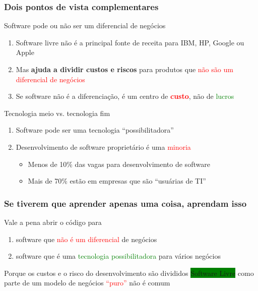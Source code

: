 \documentclass[xcolor=dvipsnames]{beamer}
\newcommand{\tred}[1]{\textcolor{red}{#1}}
\newcommand{\tgreen}[1]{\textcolor{green}{#1}}
\newcommand{\bgreen}[1]{\colorbox{green}{#1}}
\begin{document}
\begin{frame}
	\frametitle{Dois pontos de vista complementares}
	\begin{block}{Software pode ou não ser um diferencial de negócios}
	\begin{enumerate}
	\item Software livre não é a principal fonte de receita para IBM, HP, Google ou Apple\vspace{0.1cm}
	\item Mas \textbf{ajuda a dividir custos e riscos} para produtos que \tred{não são um diferencial de negócios}\vspace{0.1cm}\pause
	\item Se software não é a diferenciação, é um centro de \textbf{\tred{custo}}, não de \tgreen{lucros}
	\end{enumerate}
	\end{block}

	\begin{block}{Tecnologia meio vs. tecnologia fim}
	\begin{enumerate}
	\item Software pode ser uma tecnologia ``possibilitadora'' \vspace{0.1cm}
	\item Desenvolvimento de software proprietário é uma \tred{minoria}
	  \begin{itemize}
	  \item Menos de 10\% das vagas para desenvolvimento de software\vspace{0.1cm}
	  \item Mais de 70\% estão em empresas que são ``usuárias de TI''
	  \end{itemize}  
	\end{enumerate}
	\end{block}
\end{frame}

\begin{frame}
	\frametitle{Se tiverem que aprender apenas uma coisa, aprendam isso}
	{\Large Vale a pena abrir o código para}\vspace{0.1cm}
	\begin{enumerate}
	\item software que \tred{não é um diferencial} de negócios\vspace{0.1cm}
	\item software que é uma \tgreen{tecnologia possibilitadora} para vários negócios\vspace{0.1cm}
	\end{enumerate}
	\vspace{0.2cm}\pause 
	{\large Porque os custos e o risco do desenvolvimento são divididos}\vspace{0.2cm} \pause
	{\large \bgreen{Software Livre} como parte de um modelo de negócios \tred{``puro''} não é comum}\vspace{0.2cm}
\end{frame}
\end{document}
